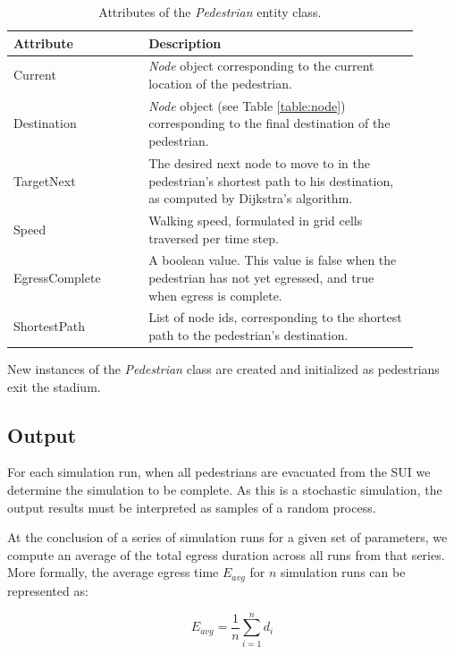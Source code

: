 \documentclass[12pt]{article}
\begin{document}
\def\arraystretch{1.5}
\begin{table}[hb!]
  \centering
    \begin{tabular}{p{0.3\linewidth}p{0.6\linewidth}}
     \hline
     Attribute & Description \\
     \hline
     Current        & \textit{Node} object corresponding to the current
                      location of the pedestrian. \\
     Destination    & \textit{Node} object (see Table \ref{table:node})
                      corresponding to the final destination of the
                      pedestrian. \\
     TargetNext     & The desired next node to move to in the pedestrian's
                      shortest path to his destination, as computed by
                      Dijkstra's algorithm. \\
     Speed          & Walking speed, formulated in grid cells traversed per
                      time step. \\
     EgressComplete & A boolean value. This value is false when the pedestrian
                      has not yet egressed, and true when egress is complete. \\
     ShortestPath & List of node ids, corresponding to the shortest path to the
                    pedestrian's destination. \\
     \hline
    \end{tabular}
    \caption{Attributes of the \textit{Pedestrian} entity class.}
  \label{table:ped}
\end{table}

New instances of the \textit{Pedestrian} class are created and initialized
as pedestrians exit the stadium.

\subsection{Output}
For each simulation run, when all pedestrians are evacuated from the SUI we
determine the simulation to be complete. As this is a stochastic simulation,
the output results must be interpreted as samples of a random process.

At the conclusion of a series of simulation runs for a given set of parameters,
we compute an average of the total egress duration across all runs from that
series. More formally, the average egress time $E_{avg}$ for $n$ simulation runs
can be represented as:

\begin{equation}
E_{avg} = \frac{1}{n}\sum\limits_{i=1}^n d_i
\end{equation}
\end{document}

